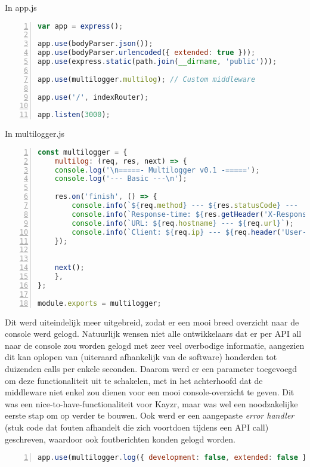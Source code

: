 In app.js
\begin{lstlisting}[language=JavaScript, breaklines=true, numbers=left, frame=single, caption={app.js eerste stap},label=code:appjsFirst]
var app = express();

app.use(bodyParser.json());
app.use(bodyParser.urlencoded({ extended: true }));
app.use(express.static(path.join(__dirname, 'public')));

app.use(multilogger.multilog); // Custom middleware

app.use('/', indexRouter);

app.listen(3000);
\end{lstlisting}

In multilogger.js
\begin{lstlisting}[language=JavaScript, breaklines=true, numbers=left, frame=single, caption={multilogger.js eerste stap},label=code:multilogFirst]
const multilogger = {
	multilog: (req, res, next) => {
	console.log('\n=====- Multilogger v0.1 -=====');
	console.log('--- Basic ---\n');
	
	res.on('finish', () => {
		console.info(`${req.method} --- ${res.statusCode} ---  ${res.statusMessage}  at ${new Date().toLocaleString()}`);
		console.info(`Response-time: ${res.getHeader('X-Response-Time')}`);
		console.info(`URL: ${req.hostname} --- ${req.url}`);
		console.info(`Client: ${req.ip} --- ${req.header('User-Agent')}`);
	});
	

	next();
	},
};

module.exports = multilogger; 
\end{lstlisting}

Dit werd uiteindelijk meer uitgebreid, zodat er een mooi breed overzicht naar de console werd gelogd. Natuurlijk wensen niet alle ontwikkelaars dat er per API all naar de console zou worden gelogd met zeer veel overbodige informatie, aangezien dit kan oplopen van (uiteraard afhankelijk van de software) honderden tot duizenden calls per enkele seconden. Daarom werd er een parameter toegevoegd om deze functionaliteit uit te schakelen, met in het achterhoofd dat de middleware niet enkel zou dienen voor een mooi console-overzicht te geven. Dit was een nice-to-have-functionaliteit voor Kayzr, maar was wel een noodzakelijke eerste stap om op verder te bouwen. Ook werd er een aangepaste \textit{error handler} (stuk code dat fouten afhandelt die zich voortdoen tijdens een API call) geschreven, waardoor ook foutberichten konden gelogd worden.

\begin{lstlisting}[language=JavaScript, breaklines=true, numbers=left, frame=single, caption={Parameters toegevoegd},label=code:multilogparams]
app.use(multilogger.log({ development: false, extended: false }));
\end{lstlisting}

